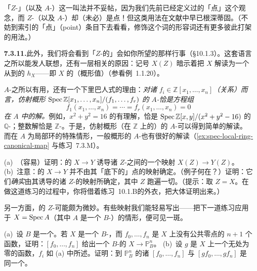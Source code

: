 「$Z$-\trValuedPoint」（以及 $A$-\trValuedPoint）这一叫法并不妥帖，因为我们先前已经定义过\trScheme{}的「点」这个观念，而 $Z$-\trValuedPoint（以及 $A$-\trValuedPoint）却（未必）是点！但这类用法在文献中早已根深蒂固。（不妨到索引的「点」（point）条目下去看看，修饰这个词的形容词还有更多彼此打架的用法。）

\textbf{7.3.11.}\quad 此外，我们将会看到「$Z$-\trValuedPoint{}的\trProduct」会如你所望的那样行事（\S10.1.3）。这套语言之所以能发人联想，还有一层相关的原因：记号 $X(Z)$ 暗示着把 $X$ 解读为一个从\trScheme{}到\trSet{}的\textbf{\trContravariantFunctor} $h_X$——即\trScheme{} $X$ 的（概形值）\trFunctorOfPoints（参看例~1.1.20）。

$A$-\trValuedPoint{}之所以有用，还有一个下里巴人式的理由：\emph{对诸 $f_i\in\mathbb{Z}[x_1,\dots,x_n]$（关系）而言，仿射概形 $\operatorname{Spec}\mathbb{Z}[x_1,\dots,x_n]/(f_1,\dots,f_r)$ 的 $A$-\trValuedPoint{}恰是方程组}
\[
f_1(x_1,\dots,x_n)=\cdots=f_r(x_1,\dots,x_n)=0
\]
\emph{在\trRing{} $A$ 中的解。}例如，$x^2+y^2=16$ 的有理解，恰是 $\operatorname{Spec}\mathbb{Z}[x,y]/(x^2+y^2-16)$ 的 $\mathbb{Q}$-\trValuedPoint{}；整数解恰是 $\mathbb{Z}$-\trValuedPoint{}。于是，仿射概形（在 $\mathbb{Z}$ 上\trFiniteType{}的）的 $A$-\trValuedPoint{}可以得到简单的解读。而在 $A$ 为局部环的特殊情形，一般概形的 $A$-\trValuedPoint{}也有很好的解读（\cref{ex:spec-local-ring-canonical-map} 与练习~7.3.M）。

\begin{exercise}\label{ex:valued-points-determine-morphisms}
(a)~（容易）证明：\trScheme{}的\trMorphism{} $X\to Y$ 诱导诸 $Z$-\trValuedPoint{}之间的一个映射 $X(Z)\to Y(Z)$。
(b)~注意：\trScheme{}的\trMorphism{} $X\to Y$ 并不由其「底下的」点的映射确定。（例子何在？）证明：它们\emph{确实}由其诱导的诸 $Z$-\trValuedPoint{}的映射所确定，其中 $Z$ 跑遍一切\trScheme。（提示：取 $Z=X$。在做这道练习的过程中，你将借着\mbox{练习~10.1.B}的外衣，把\trYonedaLemma{}大体证明出来。）
\end{exercise}

另一方面，\trProjectiveSpace{}的 $Z$-\trValuedPoint{}可能颇为微妙。有些映射我们能轻易写出——把下一道练习应用于 $X=\operatorname{Spec} A$（其中 $A$ 是一个 $B$-\trAlgebra）的情形，便可见一斑。

\begin{exercise}\label{ex:no-common-zeros-projective}
(a)~设 $B$ 是一个\trRing。若 $X$ 是一个 $B$-\trScheme，而 $f_0,\dots,f_n$ 是 $X$ 上没有公共零点的 $n+1$ 个函数，证明：$[f_0,\dots,f_n]$ 给出一个 $B$-\trScheme{}的\trMorphism{} $X\to\mathbb{P}^n_B$。
(b)~设 $g$ 是 $X$ 上一个无处为零的函数，$f_i$ 如 (a) 中所述。证明：到 $\mathbb{P}^n_B$ 的诸\trMorphism{} $[f_0,\dots,f_n]$ 与 $[gf_0,\dots,gf_n]$ 是同一个。
\end{exercise}

